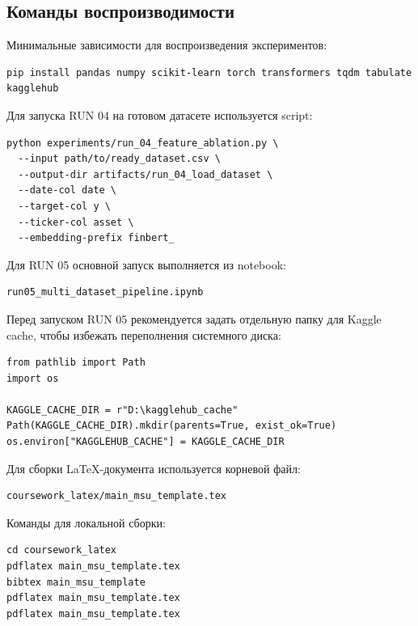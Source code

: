 \subsection*{Команды воспроизводимости}

Минимальные зависимости для воспроизведения экспериментов:

\begin{Verbatim}[fontsize=\small]
pip install pandas numpy scikit-learn torch transformers tqdm tabulate kagglehub
\end{Verbatim}

Для запуска RUN 04 на готовом датасете используется script:

\begin{Verbatim}[fontsize=\small]
python experiments/run_04_feature_ablation.py \
  --input path/to/ready_dataset.csv \
  --output-dir artifacts/run_04_load_dataset \
  --date-col date \
  --target-col y \
  --ticker-col asset \
  --embedding-prefix finbert_
\end{Verbatim}

Для RUN 05 основной запуск выполняется из notebook:

\begin{Verbatim}[fontsize=\small]
run05_multi_dataset_pipeline.ipynb
\end{Verbatim}

Перед запуском RUN 05 рекомендуется задать отдельную папку для Kaggle cache, чтобы избежать переполнения системного диска:

\begin{Verbatim}[fontsize=\small]
from pathlib import Path
import os

KAGGLE_CACHE_DIR = r"D:\kagglehub_cache"
Path(KAGGLE_CACHE_DIR).mkdir(parents=True, exist_ok=True)
os.environ["KAGGLEHUB_CACHE"] = KAGGLE_CACHE_DIR
\end{Verbatim}

Для сборки LaTeX-документа используется корневой файл:

\begin{Verbatim}[fontsize=\small]
coursework_latex/main_msu_template.tex
\end{Verbatim}

Команды для локальной сборки:

\begin{Verbatim}[fontsize=\small]
cd coursework_latex
pdflatex main_msu_template.tex
bibtex main_msu_template
pdflatex main_msu_template.tex
pdflatex main_msu_template.tex
\end{Verbatim}


